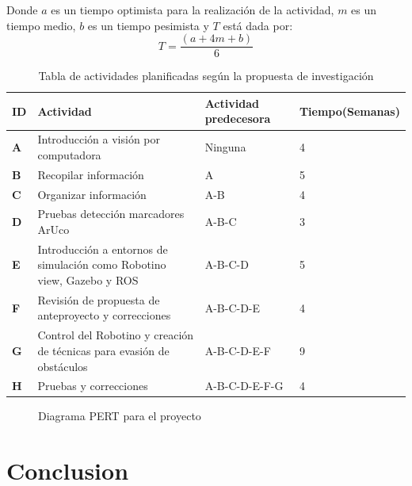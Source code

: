 Donde $a$ es un tiempo optimista para la realización de la actividad, $m$ es un tiempo medio, $b$ es un tiempo pesimista y $T$ está dada por: 
\[T=\frac{(a+4m+b)}{6}\]
\newpage
\begin{table}[h!]
\caption{Tabla de actividades planificadas según la propuesta de investigación}
\begin{centering}
\begin{tabular}{l>{\raggedright}p{5cm}ll}
\hline 
\textbf{ID} & \textbf{Actividad} & \textbf{Actividad predecesora} & \textbf{Tiempo(Semanas)}\tabularnewline
\hline 
\textbf{A} & Introducción a visión por computadora & Ninguna  & 4\tabularnewline
\hline 
\textbf{B} & Recopilar información & A & 5\tabularnewline
\hline 
\textbf{C} & Organizar información & A-B & 4\tabularnewline
\hline 
\textbf{D} & Pruebas detección marcadores ArUco & A-B-C & 3\tabularnewline
\hline 
\textbf{E} & Introducción a entornos de simulación como Robotino view, Gazebo y
ROS & A-B-C-D & 5\tabularnewline
\hline 
\textbf{F} & Revisión de propuesta de anteproyecto y correcciones & A-B-C-D-E & 4\tabularnewline
\hline 
\textbf{G} & Control del Robotino y creación de técnicas para evasión de obstáculos & A-B-C-D-E-F & 9\tabularnewline
\hline 
\textbf{H} & Pruebas y correcciones & A-B-C-D-E-F-G & 4\tabularnewline
\hline 
\end{tabular}
\par\end{centering}
\end{table}

\begin{figure}[h!]
    \centering
    \caption{Diagrama PERT para el proyecto}
    \label{fig:PERT}
\end{figure}

\cleardoublepage
\chapter{Conclusion}





